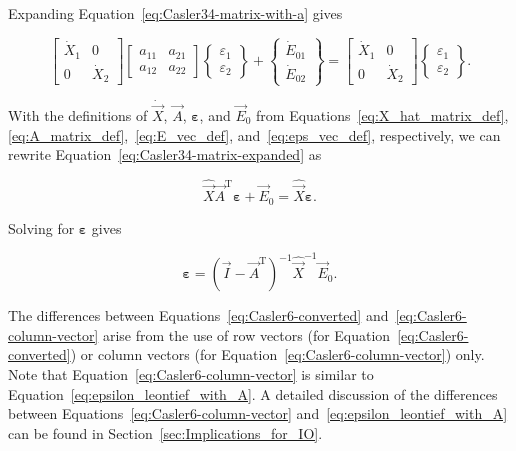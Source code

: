 \noindent{}Expanding Equation~\ref{eq:Casler34-matrix-with-a} gives

\begin{equation} \label{eq:Casler34-matrix-expanded}
	\begin{bmatrix}
		\dot{X}_{1} & 0 \\
		0           & \dot{X}_{2}
	\end{bmatrix}
	\begin{bmatrix}
		a_{11} & a_{21} \\
		a_{12} & a_{22}
	\end{bmatrix}
	\begin{Bmatrix}
		\varepsilon_{1} \\
		\varepsilon_{2}
	\end{Bmatrix}
	+
	\begin{Bmatrix}
		\dot{E}_{01} \\
		\dot{E}_{02}
	\end{Bmatrix}
	=
	\begin{bmatrix}
		\dot{X}_{1} & 0 \\
		0           & \dot{X}_{2}
	\end{bmatrix}
	\begin{Bmatrix}
		\varepsilon_{1} \\
		\varepsilon_{2}
	\end{Bmatrix}.
\end{equation}

\noindent{}With the definitions of $\dot{\vec{X}}$,
$\vec{A}$, $\bm{\varepsilon}$, and $\vec{E}_{0}$
from Equations~\ref{eq:X_hat_matrix_def},
\ref{eq:A_matrix_def},~\ref{eq:E_vec_def}, 
and~\ref{eq:eps_vec_def}, respectively,
we can rewrite Equation~\ref{eq:Casler34-matrix-expanded} as

\begin{equation}
	\hat{\vec{X}} \vec{A}^{\mathrm{T}} \bm{\varepsilon}
	+ \vec{E}_{0}
	= \hat{\vec{X}} \bm{\varepsilon}.
\end{equation}

\noindent{}Solving for $\bm{\varepsilon}$ gives

\begin{equation} \label{eq:Casler6-column-vector}
	\bm{\varepsilon}
	= {(\vec{I} - \vec{A}^{\mathrm{T}})}^{-1} 
		\hat{\vec{X}}^{-1} 
		\vec{E}_{0}.
\end{equation}

The differences between Equations~\ref{eq:Casler6-converted}
and~\ref{eq:Casler6-column-vector} arise from the use 
of row vectors (for Equation~\ref{eq:Casler6-converted})
or column vectors (for Equation~\ref{eq:Casler6-column-vector}) only.
Note that Equation~\ref{eq:Casler6-column-vector} is similar
to Equation~\ref{eq:epsilon_leontief_with_A}.
A detailed discussion of the differences 
between Equations~\ref{eq:Casler6-column-vector} and~\ref{eq:epsilon_leontief_with_A}
can be found in Section~\ref{sec:Implications_for_IO}.


